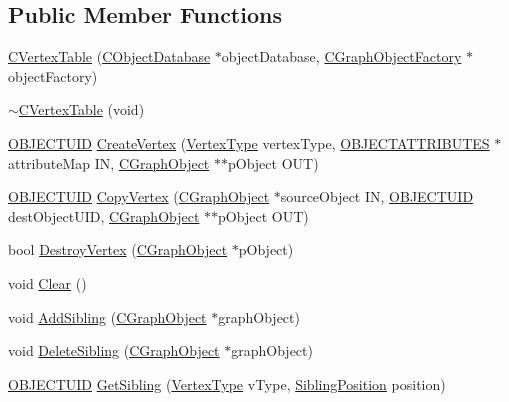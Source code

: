 \subsection*{Public Member Functions}
\begin{DoxyCompactItemize}
\item 
\hyperlink{class_c_vertex_table_a561b683b554bde1bab8232f695eccf95}{C\+Vertex\+Table} (\hyperlink{class_c_object_database}{C\+Object\+Database} $\ast$object\+Database, \hyperlink{class_c_graph_object_factory}{C\+Graph\+Object\+Factory} $\ast$object\+Factory)
\item 
\hyperlink{class_c_vertex_table_a2549a706288bf8b9d79fe9e936f6f7a0}{$\sim$\+C\+Vertex\+Table} (void)
\item 
\hyperlink{_object_database_defines_8h_a164ec120b01429b93c9cd0bef2a67e64}{O\+B\+J\+E\+C\+T\+U\+I\+D} \hyperlink{class_c_vertex_table_a28336d9d5b8c96b96cc4ca5a212f9b79}{Create\+Vertex} (\hyperlink{_object_database_defines_8h_afa099a55c5746eff5a0e1ffc04f53cc0}{Vertex\+Type} vertex\+Type, \hyperlink{_object_database_defines_8h_a52d1b76b66b20eeaf0c5dc8127da21d7}{O\+B\+J\+E\+C\+T\+A\+T\+T\+R\+I\+B\+U\+T\+E\+S} $\ast$attribute\+Map I\+N, \hyperlink{class_c_graph_object}{C\+Graph\+Object} $\ast$$\ast$p\+Object O\+U\+T)
\item 
\hyperlink{_object_database_defines_8h_a164ec120b01429b93c9cd0bef2a67e64}{O\+B\+J\+E\+C\+T\+U\+I\+D} \hyperlink{class_c_vertex_table_a1d9a7d718cd585f73b631caad3c3b98a}{Copy\+Vertex} (\hyperlink{class_c_graph_object}{C\+Graph\+Object} $\ast$source\+Object I\+N, \hyperlink{_object_database_defines_8h_a164ec120b01429b93c9cd0bef2a67e64}{O\+B\+J\+E\+C\+T\+U\+I\+D} dest\+Object\+U\+I\+D, \hyperlink{class_c_graph_object}{C\+Graph\+Object} $\ast$$\ast$p\+Object O\+U\+T)
\item 
bool \hyperlink{class_c_vertex_table_af64831dc0288ce7a53f55c0a761254b7}{Destroy\+Vertex} (\hyperlink{class_c_graph_object}{C\+Graph\+Object} $\ast$p\+Object)
\item 
void \hyperlink{class_c_vertex_table_a624cc9a4efbda23ded23624c5ba25dbd}{Clear} ()
\item 
void \hyperlink{class_c_vertex_table_a7558c9c65ed11c4042cd180345b86f72}{Add\+Sibling} (\hyperlink{class_c_graph_object}{C\+Graph\+Object} $\ast$graph\+Object)
\item 
void \hyperlink{class_c_vertex_table_a337cbe4efe53ecef8c0e5194ab7ce42c}{Delete\+Sibling} (\hyperlink{class_c_graph_object}{C\+Graph\+Object} $\ast$graph\+Object)
\item 
\hyperlink{_object_database_defines_8h_a164ec120b01429b93c9cd0bef2a67e64}{O\+B\+J\+E\+C\+T\+U\+I\+D} \hyperlink{class_c_vertex_table_a5651a03dc41e43c424a001c099520cea}{Get\+Sibling} (\hyperlink{_object_database_defines_8h_afa099a55c5746eff5a0e1ffc04f53cc0}{Vertex\+Type} v\+Type, \hyperlink{_object_database_defines_8h_a9507b0b115184061c7002f25c82fc6d7}{Sibling\+Position} position)

\end{DoxyCompactItemize}
